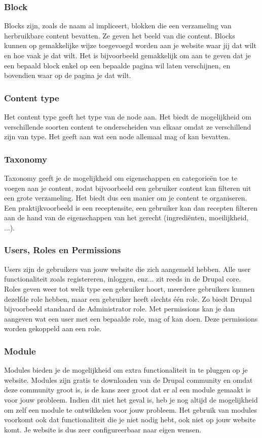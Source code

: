 \subsubsection{Block}
Blocks zijn, zoals de naam al impliceert, blokken die een verzameling van herbruikbare content bevatten. Ze geven het beeld van die content. Blocks kunnen op gemakkelijke wijze toegevoegd worden aan je website waar jij dat wilt en hoe vaak je dat wilt. Het is bijvoorbeeld gemakkelijk om aan te geven dat je een bepaald block enkel op een bepaalde pagina wil laten verschijnen, en bovendien waar op de pagina je dat wilt.

\subsubsection{Content type}
Het content type geeft het type van de node aan. Het biedt de mogelijkheid om verschillende soorten content te onderscheiden van elkaar omdat ze verschillend zijn van type. Het geeft aan wat een node allemaal mag of kan bevatten.

\subsubsection{Taxonomy}
Taxonomy geeft je de mogelijkheid om eigenschappen en categorie\"{e}n toe te voegen aan je content, zodat bijvoorbeeld een gebruiker content kan filteren uit een grote verzameling. Het biedt dus een manier om je content te organiseren. Een praktijkvoorbeeld is een receptensite, een gebruiker kan dan recepten filteren aan de hand van de eigenschappen van het gerecht (ingredi\"{e}nten, moeilijkheid, ...).

\subsubsection{Users, Roles en Permissions}
Users zijn de gebruikers van jouw website die zich aangemeld hebben. Alle user functionaliteit zoals registereren, inloggen, enz... zit reeds in de Drupal core. Roles geven weer tot welk type een gebruiker hoort, meerdere gebruikers kunnen dezelfde role hebben, maar een gebruiker heeft slechts \'{e}\'{e}n role. Zo biedt Drupal bijvoorbeeld standaard de Administrator role. Met permissions kan je dan aangeven wat een user met een bepaalde role, mag of kan doen. Deze permissions worden gekoppeld aan een role.

\subsubsection{Module}
Modules bieden je de mogelijkheid om extra functionaliteit in te pluggen op je website. Modules zijn gratis te downloaden van de Drupal community en omdat deze community groot is, is de kans zeer groot dat er al een module gemaakt is voor jouw probleem. Indien dit niet het geval is, heb je nog altijd de mogelijkheid om zelf een module te ontwikkelen voor jouw probleem. Het gebruik van modules voorkomt ook dat functionaliteit die je niet nodig hebt, ook niet op jouw website komt. Je website is dus zeer configureerbaar naar eigen wensen.

